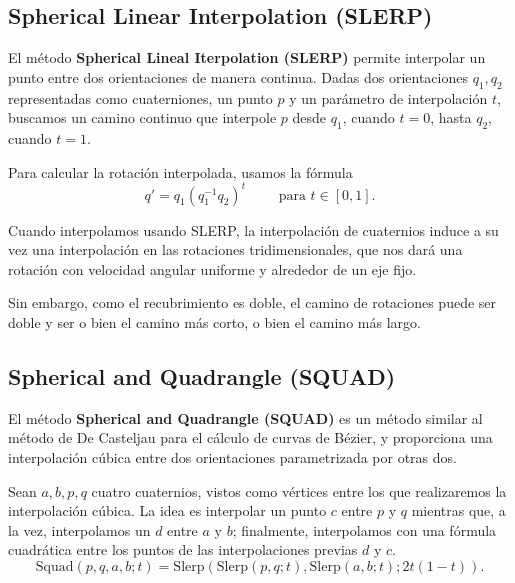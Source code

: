 \documentclass{article}
\theoremstyle{plain}
\theoremstyle{definition}
\theoremstyle{remark}
\begin{document}
\subsection{Spherical Linear Interpolation (SLERP)}

El método \textbf{Spherical Lineal Iterpolation (SLERP)} permite
interpolar un punto entre dos orientaciones de manera continua. Dadas
dos orientaciones $q_1,q_2$ representadas como cuaterniones, un punto
$p$ y un parámetro de interpolación $t$, buscamos un camino continuo
que interpole $p$ desde $q_1$, cuando $t=0$, hasta $q_2$, cuando
$t=1$.

Para calcular la rotación interpolada, usamos la fórmula \cite{vince11}
\[q' = q_1(q_1^{-1}q_2)^t \qquad\text{ para } t \in [0,1].\]

Cuando interpolamos usando SLERP, la interpolación de cuaternios
induce a su vez una interpolación en las rotaciones tridimensionales,
que nos dará una rotación con velocidad angular uniforme y alrededor
de un eje fijo.

Sin embargo, como el recubrimiento es doble, el camino de rotaciones
puede ser doble y ser o bien el camino más corto, o bien el camino más
largo.


\subsection{Spherical and Quadrangle (SQUAD)}

El método \textbf{Spherical and Quadrangle (SQUAD)} es un método
similar al método de De Casteljau para el cálculo de curvas de Bézier,
y proporciona una interpolación cúbica entre dos orientaciones
parametrizada por otras dos.

Sean $a,b,p,q$ cuatro cuaternios, vistos como vértices entre los que
realizaremos la interpolación cúbica. La idea es interpolar un punto
$c$ entre $p$ y $q$ mientras que, a la vez, interpolamos un $d$ entre
$a$ y $b$; finalmente, interpolamos con una fórmula cuadrática entre
los puntos de las interpolaciones previas $d$ y $c$.
\[
  \mathrm{Squad}(p,q,a,b;t) =
  \mathrm{Slerp}(\mathrm{Slerp}(p,q;t), \mathrm{Slerp}(a,b;t); 2t(1-t)).
\]

\end{document}
